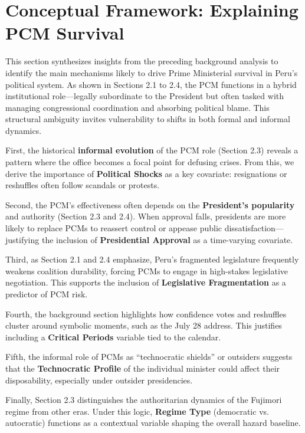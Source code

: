\documentclass[a4paper, 12pt]{article}
\begin{document}
\section{Conceptual Framework: Explaining PCM Survival}\label{concepframe}

This section synthesizes insights from the preceding background analysis to identify the main mechanisms likely to drive Prime Ministerial survival in Peru's political system. As shown in Sections 2.1 to 2.4, the PCM functions in a hybrid institutional role---legally subordinate to the President but often tasked with managing congressional coordination and absorbing political blame. This structural ambiguity invites vulnerability to shifts in both formal and informal dynamics.

First, the historical \textbf{informal evolution} of the PCM role (Section 2.3) reveals a pattern where the office becomes a focal point for defusing crises. From this, we derive the importance of \textbf{Political Shocks} as a key covariate: resignations or reshuffles often follow scandals or protests.

Second, the PCM’s effectiveness often depends on the \textbf{President's popularity} and authority (Section 2.3 and 2.4). When approval falls, presidents are more likely to replace PCMs to reassert control or appease public dissatisfaction---justifying the inclusion of \textbf{Presidential Approval} as a time-varying covariate.

Third, as Section 2.1 and 2.4 emphasize, Peru’s fragmented legislature frequently weakens coalition durability, forcing PCMs to engage in high-stakes legislative negotiation. This supports the inclusion of \textbf{Legislative Fragmentation} as a predictor of PCM risk.

Fourth, the background section highlights how confidence votes and reshuffles cluster around symbolic moments, such as the July 28 address. This justifies including a \textbf{Critical Periods} variable tied to the calendar.

Fifth, the informal role of PCMs as ``technocratic shields'' or outsiders suggests that the \textbf{Technocratic Profile} of the individual minister could affect their disposability, especially under outsider presidencies.

Finally, Section 2.3 distinguishes the authoritarian dynamics of the Fujimori regime from other eras. Under this logic, \textbf{Regime Type} (democratic vs. autocratic) functions as a contextual variable shaping the overall hazard baseline.
\end{document}
